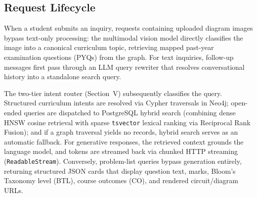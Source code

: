 \documentclass[conference]{IEEEtran}
\begin{document}
\begin{table}[t]
\caption{Technology Stack as Configured in the Repository}
\label{tab:tech-stack}
\centering
{}
\end{table}


\subsection{Request Lifecycle}
When a student submits an inquiry, requests containing uploaded diagram images bypass text-only processing: the multimodal vision model directly classifies the image into a canonical curriculum topic, retrieving mapped past-year examination questions (PYQs) from the graph. For text inquiries, follow-up messages first pass through an LLM query rewriter that resolves conversational history into a standalone search query. 

The two-tier intent router (Section~V) subsequently classifies the query. Structured curriculum intents are resolved via Cypher traversals in Neo4j; open-ended queries are dispatched to PostgreSQL hybrid search (combining dense HNSW cosine retrieval with sparse \texttt{tsvector} lexical ranking via Reciprocal Rank Fusion); and if a graph traversal yields no records, hybrid search serves as an automatic fallback. For generative responses, the retrieved context grounds the language model, and tokens are streamed back via chunked HTTP streaming (\texttt{ReadableStream}). Conversely, problem-list queries bypass generation entirely, returning structured JSON cards that display question text, marks, Bloom's Taxonomy level (BTL), course outcomes (CO), and rendered circuit/diagram URLs.
\end{document}

